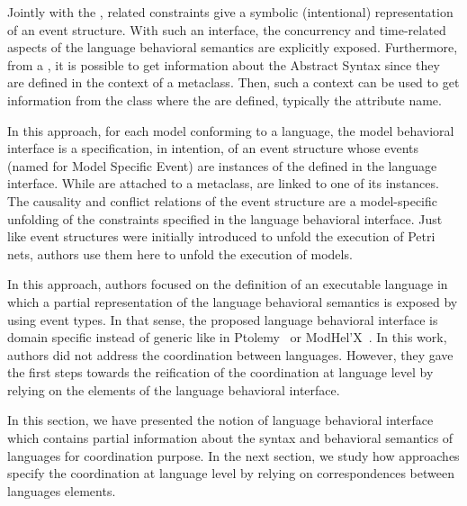 Jointly with the \dse, related constraints give a symbolic (intentional) representation of an event structure. With such an interface, the concurrency and time-related aspects of the language behavioral semantics are explicitly exposed. Furthermore, from a \dse, it is possible to get information about the Abstract Syntax since they are defined in the context of a metaclass. Then, such a context can be used to get information from the class where the \dse are defined, typically the attribute name.   

In this approach, for each model conforming to a language, the model behavioral interface is a specification, in intention, of an event structure whose events (named \mse for Model Specific Event) are instances of the \dse defined in the language interface. While \dse are attached to a metaclass, \mse are linked to one of its instances. The causality and conflict relations of the event structure are a model-specific unfolding of the constraints specified in the language behavioral interface. Just like event structures were initially introduced to unfold the execution of Petri nets, authors use them here to unfold the execution of models. 

In this approach, authors focused on the definition of an executable language in which a partial representation of the language behavioral semantics is exposed by using event types. In that sense, the proposed language behavioral interface is domain specific instead of generic like in Ptolemy~\cite{ptoleframebib} or ModHel'X~\cite{modhelxbib}. In this work, authors did not address the coordination between languages. However, they gave the first steps towards the reification of the coordination at language level by relying on the elements of the language behavioral interface.   

In this section, we have presented the notion of language behavioral interface which contains partial information about the syntax and behavioral semantics of languages for coordination purpose. In the next section, we study how approaches specify the coordination at language level by relying on correspondences between languages elements.	

	    	
	    	
	    				
